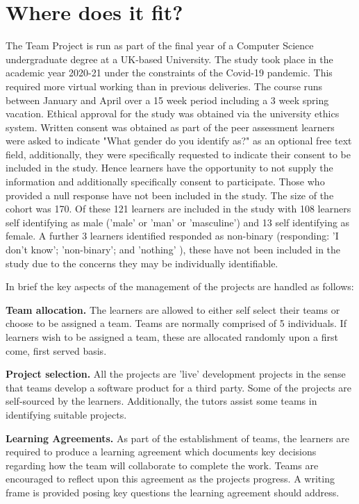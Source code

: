 \documentclass[sigconf, anonymous=true]{acmart}
\begin{document}
\section{Where does it fit?}
The Team Project is run as part of the final year of a Computer Science undergraduate degree at a UK-based University. The study took place in the academic year 2020-21 under the constraints of the Covid-19 pandemic. This required more virtual working than in previous deliveries. The course runs between January and April over a 15 week period including a 3 week spring vacation. Ethical approval for the study was obtained via the university ethics system.  Written consent was obtained as part of the peer assessment learners were asked to indicate "What gender do you identify as?" as an optional free text field, additionally, they were specifically requested to indicate their consent to be included in the study. Hence learners have the opportunity to not supply the information and additionally specifically consent to participate. Those who provided a null response have not been included in the study. The size of the cohort was 170. Of these 121 learners are included in the study with 108 learners self identifying as male ('male' or 'man' or 'masculine') and 13 self identifying as female. A further 3 learners identified responded as non-binary (responding: 'I don't know'; 'non-binary'; and 'nothing' ), these have not been included in the study due to the concerns they may be individually identifiable.

In brief the key aspects of the management of the projects are handled as follows:

    \textbf{Team allocation.}
The learners are allowed to either self select their teams or choose to be assigned a team. Teams are normally comprised of 5 individuals. If learners wish to be assigned a team, these are allocated randomly upon a first come, first served basis. 

\textbf {Project selection.}
All the projects are 'live' development projects in the sense that teams develop a software product for a third party. Some of the projects are self-sourced by the learners. Additionally, the tutors assist some teams in identifying suitable projects. 

\textbf{Learning Agreements.}
As part of the establishment of teams, the learners are required to produce a learning agreement which documents key decisions regarding how the team will collaborate to complete the work. Teams are encouraged to reflect upon this agreement as the projects progress. A writing frame is provided posing key questions the learning agreement should address. 
\end{document}
